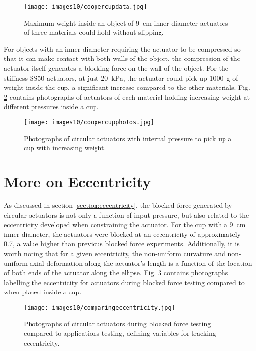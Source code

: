 \begin{figure}[ht]
    \centering
     \texttt{[image: images10/coopercupdata.jpg]}
    \caption{Maximum weight inside an object of 9~cm inner diameter actuators of three materials could hold without slipping.}
    \label{fig:coopercupdata}
\end{figure}

For objects with an inner diameter requiring the actuator to be compressed so that it can make contact with both walls of the object, the compression of the actuator itself generates a blocking force on the wall of the object. For the stiffness SS50 actuators, at just 20~kPa, the actuator could pick up 1000~g of weight inside the cup, a significant increase compared to the other materials. Fig. \ref{fig:coopercupphotos} contains photographs of actuators of each material holding increasing weight at different pressures inside a cup. 

\begin{figure}[ht]
    \centering
     \texttt{[image: images10/coopercupphotos.jpg]}
    \caption{Photographs of circular actuators with internal pressure to pick up a cup with increasing weight.}
    \label{fig:coopercupphotos}
\end{figure}

\section{More on Eccentricity}

As discussed in section \ref{section:eccentricity}, the blocked force generated by circular actuators is not only a function of input pressure, but also related to the eccentricity developed when constraining the actuator. For the cup with a 9~cm inner diameter, the actuators were blocked at an eccentricity of approximately 0.7, a value higher than previous blocked force experiments. Additionally, it is worth noting that for a given eccentricity, the non-uniform curvature and non-uniform axial deformation along the actuator's length is a function of the location of both ends of the actuator along the ellipse. Fig. \ref{fig:comparingeccentricity} contains photographs labelling the eccentricity for actuators during blocked force testing compared to when placed inside a cup. 

\begin{figure}[ht]
    \centering
     \texttt{[image: images10/comparingeccentricity.jpg]}
    \caption{Photographs of circular actuators during blocked force testing compared to applications testing, defining variables for tracking eccentricity. }
    \label{fig:comparingeccentricity}
\end{figure}

